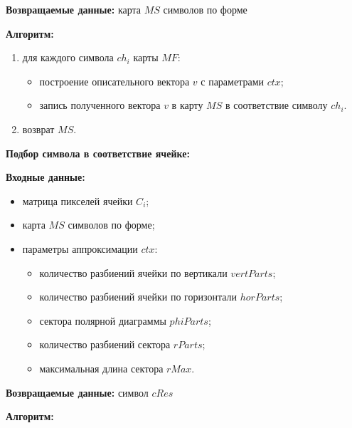 \textbf{Возвращаемые данные:} карта $MS$ символов по форме

\textbf{Алгоритм:}

\begin{enumerate}
    \item для каждого символа $ch_i$ карты $MF$:
    \begin{itemize}
        \item построение описательного вектора $v$ с параметрами $ctx$;
        \item запись полученного вектора $v$ в карту $MS$ в соответствие символу $ch_i$.
    \end{itemize}
    \item возврат $MS$.
\end{enumerate}

\textbf{Подбор символа в соответствие ячейке:}

\textbf{Входные данные:}
\begin{itemize}
    \item матрица пикселей ячейки $C_i$;
    \item карта $MS$ символов по форме;
    \item параметры аппроксимации $ctx$: 
    \begin{itemize}
        \item количество разбиений ячейки по вертикали $vertParts$;
        \item количество разбиений ячейки по горизонтали $horParts$;
        \item сектора полярной диаграммы $phiParts$;
        \item количество разбиений сектора $rParts$;
        \item максимальная длина сектора $rMax$.
    \end{itemize}
\end{itemize}

\textbf{Возвращаемые данные:} символ $cRes$

\textbf{Алгоритм:}

